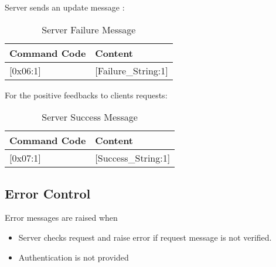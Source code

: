 Server sends an update message :

\begin{table}[ht!]
  \centering
  \begin{tabular}{l l}
\hline
\textbf{Command Code}  & \textbf{Content}\\
\hline
\hline
\textsf{[0x06:1]}  &  \textsf{[Failure\_String:1]} \\
\hline
\hline
\end{tabular}
\caption{Server Failure Message}
\end{table}


For the positive feedbacks to clients requests:

\begin{table}[ht!]
  \centering
\begin{tabular}{l l}
\hline
\textbf{Command Code}  & \textbf{Content}\\
\hline
\hline
\textsf{[0x07:1]} &\textsf{[Success\_String:1]} \\
\hline
\hline
\end{tabular}
\caption{Server Success Message}
\end{table}


\subsection{Error Control}
\label{sec:pdus:err}
Error messages are raised when
\begin{itemize}
\item Server checks request and raise error if request message is not verified.
\item Authentication is not provided
  \end{itemize}
